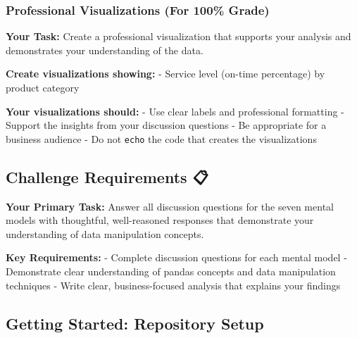 \documentclass[
]{article}
\begin{document}
\subsubsection{Professional Visualizations (For 100\%
Grade)}\label{professional-visualizations-for-100-grade}

\textbf{Your Task:} Create a professional visualization that supports
your analysis and demonstrates your understanding of the data.

\textbf{Create visualizations showing:} - Service level (on-time
percentage) by product category

\textbf{Your visualizations should:} - Use clear labels and professional
formatting - Support the insights from your discussion questions - Be
appropriate for a business audience - Do not \texttt{echo} the code that
creates the visualizations

\subsection{Challenge Requirements 📋}\label{challenge-requirements}

\textbf{Your Primary Task:} Answer all discussion questions for the
seven mental models with thoughtful, well-reasoned responses that
demonstrate your understanding of data manipulation concepts.

\textbf{Key Requirements:} - Complete discussion questions for each
mental model - Demonstrate clear understanding of pandas concepts and
data manipulation techniques - Write clear, business-focused analysis
that explains your findings

\subsection{Getting Started: Repository Setup
🚀}\label{getting-started-repository-setup}
\end{document}
